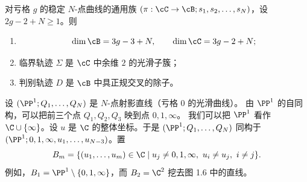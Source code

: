 \begin{lemma}[1.29]
对亏格 $g$ 的稳定 $N$-点曲线的通用族
$(\pi:\cC\to\cB;s_1,s_2,\dots,s_N)$，设 $2g-2+N\ge1$。则
\begin{enumerate}[label=(\arabic*)]
  \item 
\[
\dim\cB=3g-3+N,\qquad \dim\cC=3g-2+N;
\]
  \item 临界轨迹 $\Sigma$ 是 $\cC$ 中余维 $2$ 的光滑子簇；
  \item 判别轨迹 $D$ 是 $\cB$ 中具正规交叉的除子。
\end{enumerate}
\end{lemma}

\begin{example}[1.30]
设 $(\PP^1;Q_1,\dots,Q_N)$ 是 $N$-点射影直线（亏格 $0$ 的光滑曲线）。
由 $\PP^1$ 的自同构，可以把前三个点 $Q_1,Q_2,Q_3$ 映到点 $0,1,\infty$。
我们可以把 $\PP^1$ 看作 $\C\cup\{\infty\}$。设 $u$ 是 $\C$ 的整体坐标。于是
$(\PP^1;Q_1,\dots,Q_N)$ 同构于
$(\PP^1;0,1,\infty,u_1,\dots,u_{N-3})$。置
\[
B_m=\{(u_1,\dots,u_m)\in\C\mid
u_j\ne0,1,\infty,\ u_i\ne u_j,\ i\ne j\}.
\]
例如，$B_1=\PP^1\setminus\{0,1,\infty\}$，而 $B_2=\C^2$ 挖去图 1.6 中的直线。
\end{example}


